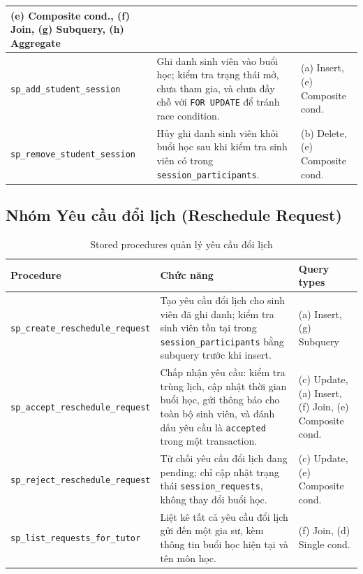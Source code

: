 \begin{table}[H]
\begin{tabular}{|p{4.5cm}|p{7.5cm}|p{2.5cm}|}
  (e) Composite cond., (f) Join, (g) Subquery, (h) Aggregate \\
\hline
\texttt{sp\_add\_student\_session} &
  Ghi danh sinh viên vào buổi học; kiểm tra trạng thái mở, chưa tham gia, và chưa đầy chỗ với \texttt{FOR UPDATE} để tránh race condition. &
  (a) Insert, (e) Composite cond. \\
\hline
\texttt{sp\_remove\_student\_session} &
  Hủy ghi danh sinh viên khỏi buổi học sau khi kiểm tra sinh viên có trong \texttt{session\_participants}. &
  (b) Delete, (e) Composite cond. \\
\hline
\end{tabular}
\end{table}

\subsection{Nhóm Yêu cầu đổi lịch (Reschedule Request)}

\begin{table}[H]
\centering
\caption{Stored procedures quản lý yêu cầu đổi lịch}
\label{tab:sp_reschedule}
\small
\begin{tabular}{|p{4.5cm}|p{7.5cm}|p{2.5cm}|}
\hline
\textbf{Procedure} & \textbf{Chức năng} & \textbf{Query types} \\
\hline
\texttt{sp\_create\_reschedule\_request} &
  Tạo yêu cầu đổi lịch cho sinh viên đã ghi danh; kiểm tra sinh viên tồn tại trong \texttt{session\_participants} bằng subquery trước khi insert. &
  (a) Insert, (g) Subquery \\
\hline
\texttt{sp\_accept\_reschedule\_request} &
  Chấp nhận yêu cầu: kiểm tra trùng lịch, cập nhật thời gian buổi học, gửi thông báo cho toàn bộ sinh viên, và đánh dấu yêu cầu là \texttt{accepted} trong một transaction. &
  (c) Update, (a) Insert, (f) Join, (e) Composite cond. \\
\hline
\texttt{sp\_reject\_reschedule\_request} &
  Từ chối yêu cầu đổi lịch đang pending; chỉ cập nhật trạng thái \texttt{session\_requests}, không thay đổi buổi học. &
  (c) Update, (e) Composite cond. \\
\hline
\texttt{sp\_list\_requests\_for\_tutor} &
  Liệt kê tất cả yêu cầu đổi lịch gửi đến một gia sư, kèm thông tin buổi học hiện tại và tên môn học. &
  (f) Join, (d) Single cond. \\
\hline
\end{tabular}
\end{table}

